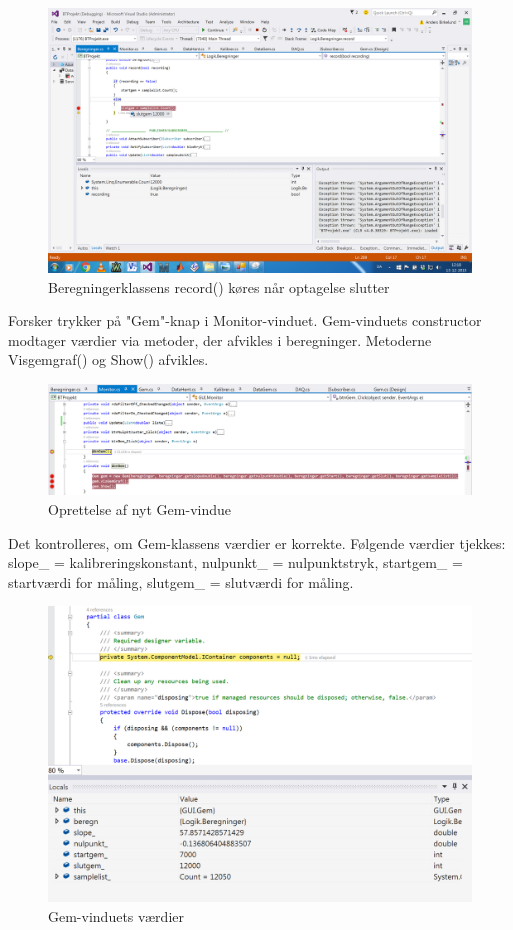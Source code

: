 \begin{figure}[H]
	\centering
	\includegraphics[width=1\textwidth]{Figurer/UC6_Record_Slut}
	\caption{Beregningerklassens record() køres når optagelse slutter}
\end{figure}

Forsker trykker på "Gem"\--knap i Monitor-vinduet. Gem-vinduets constructor modtager værdier via metoder, der afvikles i beregninger. Metoderne Visgemgraf() og Show() afvikles.

\begin{figure}[H]
	\centering
	\includegraphics[width=1\textwidth]{Figurer/UC6_BtnGem}
	\caption{Oprettelse af nyt Gem-vindue}
\end{figure}

Det kontrolleres, om Gem-klassens værdier er korrekte. Følgende værdier tjekkes: slope\_ = kalibreringskonstant, nulpunkt\_ = nulpunktstryk, startgem\_ = startværdi for måling, slutgem\_ = slutværdi for måling.

\begin{figure}[H]
	\centering
	\includegraphics[width=1\textwidth]{Figurer/UC6_Vardier}
	\caption{Gem-vinduets værdier}
\end{figure}

